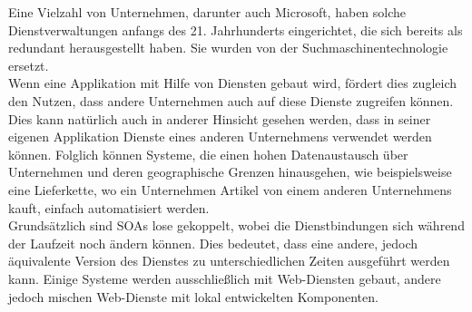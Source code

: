 Eine Vielzahl von Unternehmen, darunter auch Microsoft, haben solche Dienstverwaltungen anfangs des 21. Jahrhunderts eingerichtet, die sich bereits als redundant herausgestellt haben. Sie wurden von der Suchmaschinentechnologie ersetzt.\\
Wenn eine Applikation mit Hilfe von Diensten gebaut wird, fördert dies zugleich den Nutzen, dass andere Unternehmen auch auf diese Dienste zugreifen können. Dies kann natürlich auch in anderer Hinsicht gesehen werden, dass in seiner eigenen Applikation Dienste eines anderen Unternehmens verwendet werden können. Folglich können Systeme, die einen hohen Datenaustausch über Unternehmen und deren geographische Grenzen hinausgehen, wie beispielsweise eine Lieferkette, wo ein Unternehmen Artikel von einem anderen Unternehmens kauft, einfach automatisiert werden.\\
Grundsätzlich sind SOAs lose gekoppelt, wobei die Dienstbindungen sich während der Laufzeit noch ändern können. Dies bedeutet, dass eine andere, jedoch äquivalente Version des Dienstes zu unterschiedlichen Zeiten ausgeführt werden kann. Einige Systeme werden ausschließlich mit Web-Diensten gebaut, andere jedoch mischen Web-Dienste mit lokal entwickelten Komponenten.\\




